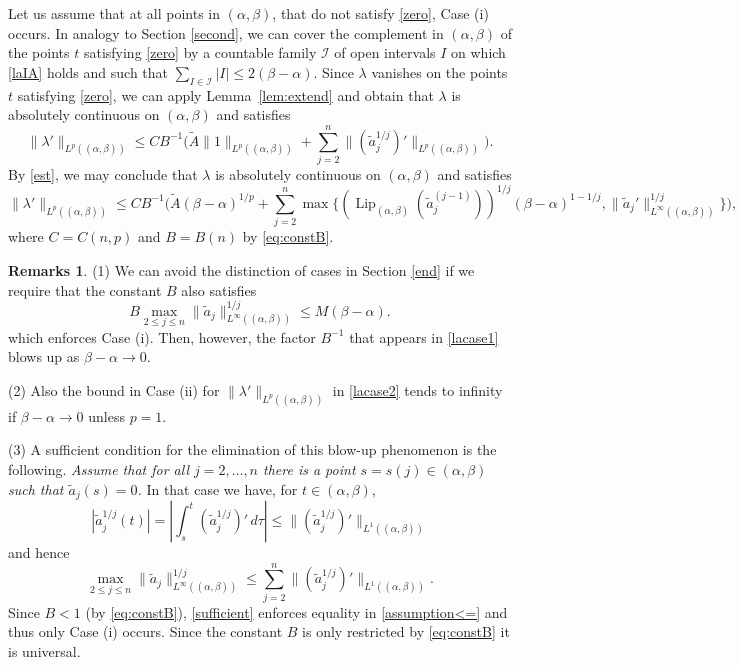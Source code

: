 \documentclass[12pt]{amsart}
\theoremstyle{plain}
\theoremstyle{definition}
\newtheorem*{remarks*}{Remarks}
\numberwithin{equation}{section}
\let\on=\operatorname
\begin{document}
Let us assume that at all points in $({\alpha},{\beta})$, that do not satisfy \eqref{zero}, Case (i) occurs. 
In analogy to Section \ref{second}, we can cover the complement in $({\alpha},{\beta})$ of the points $t$ satisfying \eqref{zero} 
by a countable family ${\mathcal{I}}$ of open intervals $I$ on which \eqref{laIA} holds and such that 
$\sum_{I \in {\mathcal{I}}} |I| \le 2 ({\beta}-{\alpha})$.
Since ${\lambda}$ vanishes on the points $t$ satisfying \eqref{zero}, we can apply Lemma~\ref{lem:extend} and obtain
that ${\lambda}$ is absolutely continuous on $({\alpha},{\beta})$ and satisfies
\begin{equation*}
  \|{\lambda}'\|_{L^p(({\alpha},{\beta}))} \le  C B^{-1}  \Big(\tilde A \|1\|_{L^p(({\alpha},{\beta}))} + \sum_{j=2}^n \|(\tilde a_j^{1/j})'\|_{L^p (({\alpha},{\beta}))}\Big).
\end{equation*}
By \eqref{est}, we may conclude that ${\lambda}$ is absolutely continuous on $({\alpha},{\beta})$ and satisfies  
\begin{equation} \label{lacase1}
  \|{\lambda}'\|_{L^p(({\alpha},{\beta}))} \le  C B^{-1}  \Big(\tilde A ({\beta}-{\alpha})^{1/p} 
  + \sum_{j=2}^n \max \Big\{ ({\on{Lip}}_{({\alpha},{\beta})}(\tilde a_j^{(j-1)}))^{1/j}  ({\beta}-{\alpha})^{1-1/j}, 
  \|\tilde a_j'\|^{1/j}_{L^\infty(({\alpha},{\beta}))}
   \Big\} \Big),
\end{equation}
where $C = C(n,p)$ and $B= B(n)$ by \eqref{eq:constB}.

\begin{remarks*}
  (1) We can avoid the distinction of cases in Section \ref{end} if we require that the constant $B$ also satisfies 
  \begin{equation}
    B  \max_{2 \le j \le n} \|\tilde a_j\|_{L^\infty(({\alpha},{\beta}))}^{1/j} \le {M} ({\beta} -{\alpha}). \label{eq:constB2}
  \end{equation} 
  which enforces Case (i). Then, however, the factor $B^{-1}$ that appears in \eqref{lacase1} blows up as 
  ${\beta} - {\alpha} \to 0$.

  (2) Also the bound in Case (ii) for $\|{\lambda}'\|_{L^p(({\alpha},{\beta}))}$ in \eqref{lacase2} tends to infinity if ${\beta} - {\alpha} \to 0$ 
  unless $p=1$.

  (3) A sufficient condition for the elimination of this blow-up phenomenon is the following. 
  \emph{Assume that for all $j = 2,\ldots,n$ there is a point $s = s(j) \in ({\alpha},{\beta})$ such that $\tilde a_j(s) =0$.}
  In that case we have, for $t \in ({\alpha},{\beta})$, 
  \[
    |\tilde a_j^{1/j}(t)| = |\int_s^t (\tilde a_j^{1/j})'\, d {\tau}| \le \|(\tilde a_j^{1/j})'\|_{L^1(({\alpha},{\beta}))}
  \]
  and hence 
  \begin{equation} \label{sufficient}
      \max_{2 \le j \le n} \|\tilde a_j\|_{L^\infty(({\alpha},{\beta}))}^{1/j} \le \sum_{j=2}^n \|(\tilde a_j^{1/j})'\|_{L^1(({\alpha},{\beta}))}. 
  \end{equation}
  Since $B<1$ (by \eqref{eq:constB}), \eqref{sufficient} enforces equality in \eqref{assumption<=} and thus only Case (i) occurs. 
  Since the constant $B$ is only restricted by \eqref{eq:constB} it is universal.
\end{remarks*}
\end{document}
